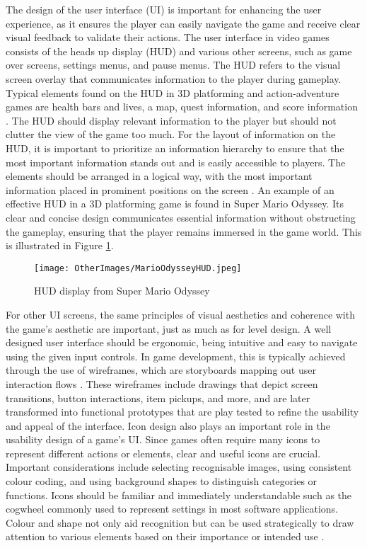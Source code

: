 \documentclass[10pt]{final_report}
\begin{document}
The design of the user interface (UI) is important for enhancing the user experience, as it ensures the player can easily navigate the game and receive clear visual feedback to validate their actions. The user interface in video games consists of the heads up display (HUD) and various other screens, such as game over screens, settings menus, and pause menus. The HUD refers to the visual screen overlay that communicates information to the player during gameplay. Typical elements found on the HUD in 3D platforming and action-adventure games are health bars and lives, a map, quest information, and score information \cite{Rogers2014}. The HUD should display relevant information to the player but should not clutter the view of the game too much. For the layout of information on the HUD, it is important to prioritize an information hierarchy to ensure that the most important information stands out and is easily accessible to players. The elements should be arranged in a logical way, with the most important information placed in prominent positions on the screen \cite{Hive}. An example of an effective HUD in a 3D platforming game is found in Super Mario Odyssey. Its clear and concise design communicates essential information without obstructing the gameplay, ensuring that the player remains immersed in the game world. This is illustrated in Figure \ref{fig:MarioHUD}.

\begin{figure}[H]
    \centering
    \texttt{[image: OtherImages/MarioOdysseyHUD.jpeg]}
    \caption{HUD display from Super Mario Odyssey}
    \label{fig:MarioHUD}
\end{figure}

For other UI screens, the same principles of visual aesthetics and coherence with the game’s aesthetic are important, just as much as for level design. A well designed user interface should be ergonomic, being intuitive and easy to navigate using the given input controls. In game development, this is typically achieved through the use of wireframes, which are storyboards mapping out user interaction flows \cite{Rogers2014}. These wireframes include drawings that depict screen transitions, button interactions, item pickups, and more, and are later transformed into functional prototypes that are play tested to refine the usability and appeal of the interface.\newline
Icon design also plays an important role in the usability design of a game's UI. Since games often require many icons to represent different actions or elements, clear and useful icons are crucial. Important considerations include selecting recognisable images, using consistent colour coding, and using background shapes to distinguish categories or functions. Icons should be familiar and immediately understandable such as the cogwheel commonly used to represent settings in most software applications. Colour and shape not only aid recognition but can be used strategically to draw attention to various elements based on their importance or intended use \cite{Rogers2014}.
\end{document}
